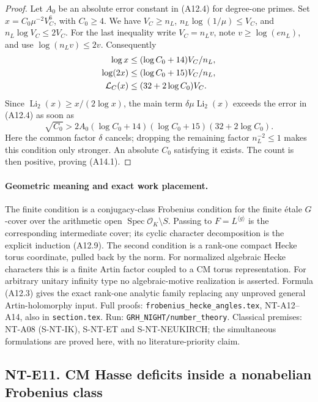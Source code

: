 \begin{proof}
Let \(A_0\) be an absolute error constant in (A12.4) for
degree-one primes. Set \(x=C_0\mu^{-2}V_C^6\), with
\(C_0\ge4\). We have \(V_C\ge n_L\),
\(n_L\log(1/\mu)\le V_C\), and
\(n_L\log V_C\le2V_C\).
For the last inequality write \(V_C=n_L v\), note
\(v\ge\log(e n_L)\), and use
\(\log(n_L v)\le2v\). Consequently
\[
 \begin{split}
 \log x&\le(\log C_0+14)V_C/n_L,\\
 \log(2x)&\le(\log C_0+15)V_C/n_L,\\
 {\cal L}_C(x)&\le(32+2\log C_0)V_C .
 \end{split}
\]
Since \(\operatorname{Li}_2(x)\ge x/(2\log x)\),
the main term \(\delta\mu\operatorname{Li}_2(x)\)
exceeds the error in (A12.4) as soon as
\[
 \sqrt{C_0}>
  2A_0(\log C_0+14)(\log C_0+15)(32+2\log C_0).
\]
Here the common factor \(\delta\) cancels; dropping the
remaining factor \(n_L^{-2}\le1\) makes this condition
only stronger. An absolute \(C_0\) satisfying it exists.
The count is then positive, proving (A14.1).
\end{proof}

\paragraph{Geometric meaning and exact work placement.}
The finite condition is a conjugacy-class Frobenius condition
for the finite \'{e}tale \(G\)-cover over the arithmetic open
\(\operatorname{Spec}\mathcal O_K\setminus S\). Passing to
\(F=L^{\langle g\rangle}\) is the corresponding intermediate
cover; its cyclic character decomposition is the explicit
induction (A12.9). The second condition is a rank-one
compact Hecke torus coordinate, pulled back by the norm.
For normalized algebraic Hecke characters this is a finite
Artin factor coupled to a CM torus representation. For
arbitrary unitary infinity type no algebraic-motive
realization is asserted. Formula (A12.3) gives the exact
rank-one analytic family replacing any unproved general
Artin-holomorphy input.
Full proofs: \texttt{frobenius\_hecke\_angles.tex},
NT-A12--A14, also in \texttt{section.tex}.
Run: \texttt{GRH\_NIGHT/number\_theory}.
Classical premises: NT-A08 (S-NT-IK), S-NT-ET and
S-NT-NEUKIRCH; the simultaneous formulations are proved
here, with no literature-priority claim.


\subsection*{NT-E11. CM Hasse deficits inside a nonabelian Frobenius class}

